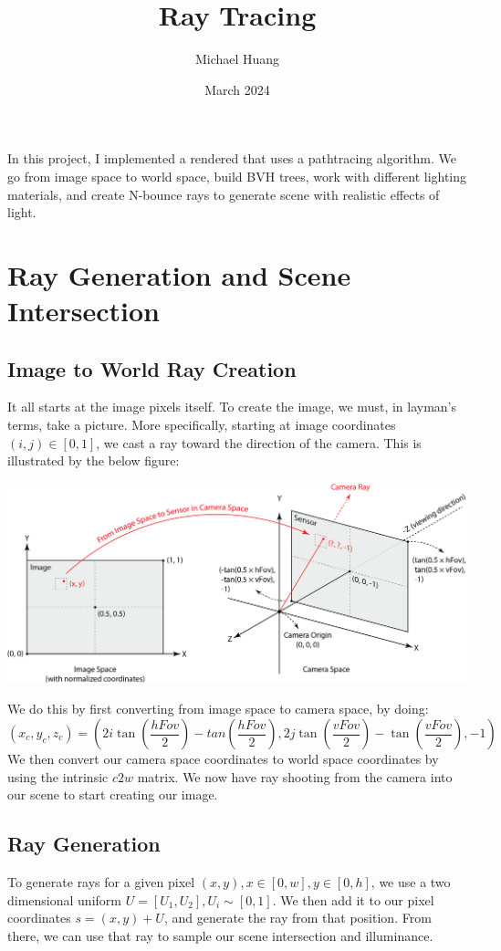 \documentclass{article}
\title{Ray Tracing}
\author{Michael Huang}
\date{March 2024}
\begin{document}
\maketitle
In this project, I implemented a rendered that uses a pathtracing algorithm. We go from image space to world space, build BVH trees, work with different lighting materials, and create N-bounce rays to generate scene with realistic effects of light.
\section{Ray Generation and Scene Intersection}
\subsection{Image to World Ray Creation}
It all starts at the image pixels itself. To create the image, we must, in layman's terms, take a picture. More specifically, starting at image coordinates $(i, j) \in [0, 1]$, we cast a ray toward the direction of the camera. This is illustrated by the below figure:
\begin{center}
    \includegraphics[width=\textwidth]{Task 1/i2c.png}
\end{center}
We do this by first converting from image space to camera space, by doing:
$$(x_c, y_c, z_c) = (2i\tan(\frac{hFov}{2}) - tan(\frac{hFov}{2}), 2j\tan(\frac{vFov}{2}) - \tan(\frac{vFov}{2}), -1)$$
We then convert our camera space coordinates to world space coordinates by using the intrinsic $c2w$ matrix. We now have ray shooting from the camera into our scene to start creating our image.
\subsection{Ray Generation}
To generate rays for a given pixel $(x, y), x \in [0, w], y\in [0, h]$, we use a two dimensional uniform $U = [U_1, U_2], U_i \sim [0, 1]$. We then add it to our pixel coordinates $s = (x, y) + U$, and generate the ray from that position. From there, we can use that ray to sample our scene intersection and illuminance.
\end{document}
